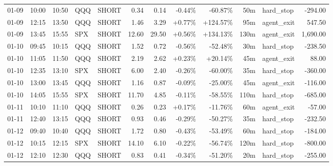 \documentclass[11pt,a4paper,twoside]{article}
\begin{document}
\begin{center}
\begin{longtable}{>{\color{txtmain}}l l l l l r r r r r >{\color{txtmain}}l r}
01-09 & 10:00 & 10:50 & QQQ & SHORT & 0.34 & 0.14 & \textcolor{lossred}{-0.44\%} & \textcolor{lossred}{-60.87\%} & 50m & hard\_stop & \textcolor{lossred}{-294.00} \\
01-09 & 12:15 & 13:50 & QQQ & SHORT & 1.46 & 3.29 & \textcolor{wingreen}{+0.77\%} & \textcolor{wingreen}{+124.57\%} & 95m & agent\_exit & \textcolor{wingreen}{547.50} \\
01-09 & 13:45 & 15:55 & SPX & SHORT & 12.60 & 29.50 & \textcolor{wingreen}{+0.56\%} & \textcolor{wingreen}{+134.13\%} & 130m & agent\_exit & \textcolor{wingreen}{1,690.00} \\
01-10 & 09:45 & 10:15 & QQQ & SHORT & 1.52 & 0.72 & \textcolor{lossred}{-0.56\%} & \textcolor{lossred}{-52.48\%} & 30m & hard\_stop & \textcolor{lossred}{-238.50} \\
01-10 & 11:05 & 11:50 & QQQ & SHORT & 2.19 & 2.62 & \textcolor{wingreen}{+0.23\%} & \textcolor{wingreen}{+20.14\%} & 45m & agent\_exit & \textcolor{wingreen}{88.00} \\
01-10 & 12:35 & 13:10 & SPX & SHORT & 6.00 & 2.40 & \textcolor{lossred}{-0.26\%} & \textcolor{lossred}{-60.00\%} & 35m & hard\_stop & \textcolor{lossred}{-360.00} \\
01-10 & 13:00 & 13:45 & QQQ & SHORT & 1.16 & 0.87 & \textcolor{lossred}{-0.09\%} & \textcolor{lossred}{-25.00\%} & 45m & agent\_exit & \textcolor{lossred}{-116.00} \\
01-10 & 14:05 & 15:55 & SPX & SHORT & 11.70 & 4.85 & \textcolor{lossred}{-0.11\%} & \textcolor{lossred}{-58.55\%} & 110m & hard\_stop & \textcolor{lossred}{-685.00} \\
01-11 & 10:10 & 11:10 & QQQ & SHORT & 0.26 & 0.23 & \textcolor{wingreen}{+0.17\%} & \textcolor{lossred}{-11.76\%} & 60m & agent\_exit & \textcolor{lossred}{-57.00} \\
01-11 & 12:40 & 13:15 & QQQ & SHORT & 0.93 & 0.46 & \textcolor{lossred}{-0.29\%} & \textcolor{lossred}{-50.27\%} & 35m & hard\_stop & \textcolor{lossred}{-232.50} \\
01-12 & 09:40 & 10:40 & QQQ & SHORT & 1.72 & 0.80 & \textcolor{lossred}{-0.43\%} & \textcolor{lossred}{-53.49\%} & 60m & hard\_stop & \textcolor{lossred}{-184.00} \\
01-12 & 10:15 & 12:15 & SPX & SHORT & 14.10 & 6.10 & \textcolor{lossred}{-0.22\%} & \textcolor{lossred}{-56.74\%} & 120m & hard\_stop & \textcolor{lossred}{-800.00} \\
01-12 & 12:10 & 12:30 & QQQ & SHORT & 0.83 & 0.41 & \textcolor{lossred}{-0.34\%} & \textcolor{lossred}{-51.20\%} & 20m & hard\_stop & \textcolor{lossred}{-255.00} \\

\end{longtable}
\end{center}
\end{document}
